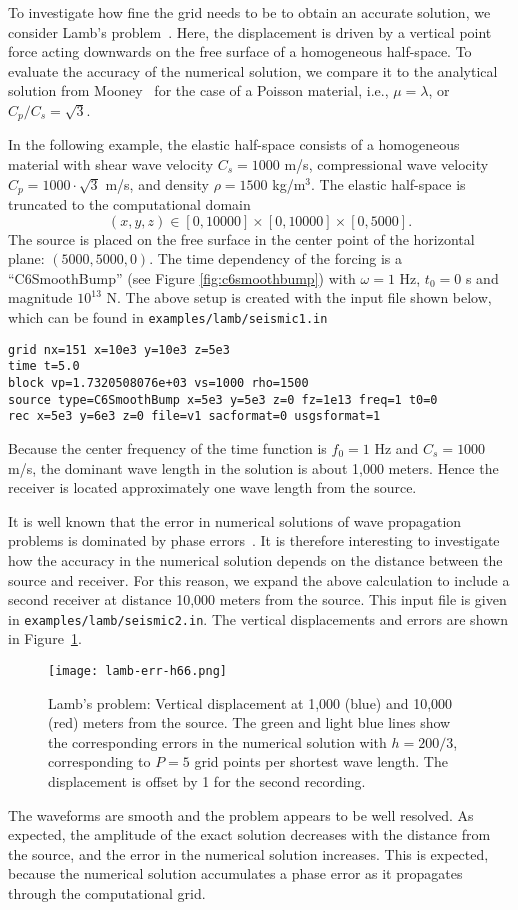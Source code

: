 \documentclass[11pt]{report}
\begin{document}
To investigate how fine the grid needs to be to obtain an accurate solution, we consider Lamb's
problem~\cite{Lamb_1904}. Here, the displacement is driven by a vertical point force acting
downwards on the free surface of a homogeneous half-space. To evaluate the accuracy of the numerical
solution, we compare it to the analytical solution from Mooney~\cite{Mooney_1974} for the case of a
Poisson material, i.e., $\mu=\lambda$, or $C_p/C_s=\sqrt{3}$.

In the following example, the elastic half-space consists of a homogeneous material with shear wave
velocity $C_s=1000$ m/s, compressional wave velocity $C_p=1000\cdot\sqrt{3}$ m/s, and density $\rho=1500$
kg/m$^3$. The elastic half-space is truncated to the computational domain
\[
(x,y,z) \in [0,10000] \times [0,10000]\times[0,5000].
\]
The source is placed on the free surface in the center point of the horizontal plane:
$(5000,5000,0)$. The time dependency of the forcing is a ``C6SmoothBump'' (see Figure
\ref{fig:c6smoothbump}) with $\omega=1$ Hz, $t_0=0$ s and magnitude $10^{13}$ N. The above setup is
created with the input file shown below, which can be found in {\tt examples/lamb/seismic1.in}
\begin{verbatim}
grid nx=151 x=10e3 y=10e3 z=5e3
time t=5.0
block vp=1.7320508076e+03 vs=1000 rho=1500
source type=C6SmoothBump x=5e3 y=5e3 z=0 fz=1e13 freq=1 t0=0
rec x=5e3 y=6e3 z=0 file=v1 sacformat=0 usgsformat=1
\end{verbatim}
Because the center frequency of the time function is $f_0=1$ Hz and $C_s=1000$ m/s, the dominant
wave length in the solution is about 1,000 meters. Hence the receiver is located approximately one
wave length from the source.

It is well known that the error in numerical solutions of wave propagation problems is dominated by
phase errors~\cite{Gustafsson-Kreiss-Oliger}. It is therefore interesting to investigate how the
accuracy in the numerical solution depends on the distance between the source and receiver. For this
reason, we expand the above calculation to include a second receiver at distance 10,000 meters from
the source. This input file is given in {\tt examples/lamb/seismic2.in}. The vertical displacements
and errors are shown in Figure~\ref{fig:lambSAC}.
\begin{figure}[ht]
  \begin{center}
    \texttt{[image: lamb-err-h66.png]}
    \caption{Lamb's problem: Vertical displacement at 1,000 (blue) and 10,000 (red) meters from the
      source. The green and light blue lines show the corresponding errors in the
      numerical solution with $h=200/3$, corresponding to $P=5$ grid points per shortest wave
      length. The displacement is offset by 1 for the second recording.}
    \label{fig:lambSAC}
  \end{center}
\end{figure}
The waveforms are smooth and the problem appears to be well resolved. As expected, the amplitude of
the exact solution decreases with the distance from the source, and the error in the numerical
solution increases. This is expected, because the numerical solution accumulates a phase error as it
propagates through the computational grid.
\end{document}

